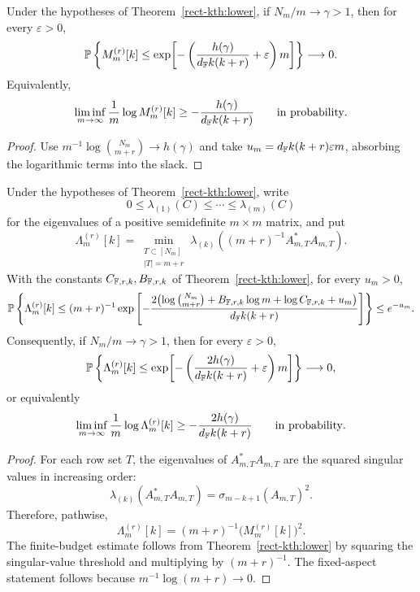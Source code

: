 \begin{corollary}\label{rect-kth:fixed-aspect-lower}
Under the hypotheses of Theorem~\ref{rect-kth:lower}, if
\(N_m/m\to\gamma>1\), then for every \(\varepsilon>0\),
\[
  \mathbb{P}\left\{M_m^{(r)}[k]\le
  \exp\!\left[-\left(\frac{h(\gamma)}{d_{\mathbb{F}} k(k+r)}+\varepsilon\right)m\right]\right\}
  \longrightarrow0.
\]
Equivalently,
\[
  \liminf_{m\to\infty}\frac1m\log M_m^{(r)}[k]
  \ge -\frac{h(\gamma)}{d_{\mathbb{F}} k(k+r)}
  \qquad\hbox{in probability}.
\]
\end{corollary}

\begin{proof}
Use \(m^{-1}\log\binom{N_m}{m+r}\to h(\gamma)\) and take
\(u_m=d_{\mathbb{F}} k(k+r)\varepsilon m\), absorbing the logarithmic terms into the
slack.
\end{proof}

\begin{corollary}\label{rect-kth:gram-lower}
Under the hypotheses of Theorem~\ref{rect-kth:lower}, write
\[
  0\le\lambda_{(1)}(C)\le\cdots\le\lambda_{(m)}(C)
\]
for the eigenvalues of a positive semidefinite \(m\times m\) matrix, and put
\[
  \Lambda_m^{(r)}[k]
  =
  \min_{\substack{T\subset[N_m]\\ |T|=m+r}}
  \lambda_{(k)}\!\left((m+r)^{-1}A_{m,T}^*A_{m,T}\right).
\]
With the constants \(C_{\mathbb{F},r,k},B_{\mathbb{F},r,k}\) of
Theorem~\ref{rect-kth:lower}, for every \(u_m>0\),
\[
  \mathbb{P}\left\{
  \Lambda_m^{(r)}[k]\le
  (m+r)^{-1}\exp\left[
  -\frac{2\bigl(\log\binom{N_m}{m+r}
    +B_{\mathbb{F},r,k}\log m+\log C_{\mathbb{F},r,k}+u_m\bigr)}
  {d_{\mathbb{F}} k(k+r)}\right]\right\}
  \le e^{-u_m}.
\]
Consequently, if \(N_m/m\to\gamma>1\), then for every \(\varepsilon>0\),
\[
  \mathbb{P}\left\{\Lambda_m^{(r)}[k]\le
  \exp\!\left[-\left(\frac{2h(\gamma)}{d_{\mathbb{F}} k(k+r)}
    +\varepsilon\right)m\right]\right\}
  \longrightarrow0,
\]
or equivalently
\[
  \liminf_{m\to\infty}\frac1m\log\Lambda_m^{(r)}[k]
  \ge -\frac{2h(\gamma)}{d_{\mathbb{F}} k(k+r)}
  \qquad\hbox{in probability}.
\]
\end{corollary}

\begin{proof}
For each row set \(T\), the eigenvalues of \(A_{m,T}^*A_{m,T}\) are the squared
singular values in increasing order:
\[
  \lambda_{(k)}(A_{m,T}^*A_{m,T})
  =
  \sigma_{m-k+1}(A_{m,T})^2 .
\]
Therefore, pathwise,
\[
  \Lambda_m^{(r)}[k]=(m+r)^{-1}\bigl(M_m^{(r)}[k]\bigr)^2 .
\]
The finite-budget estimate follows from Theorem~\ref{rect-kth:lower} by
squaring the singular-value threshold and multiplying by \((m+r)^{-1}\).  The
fixed-aspect statement follows because \(m^{-1}\log(m+r)\to0\).
\end{proof}

